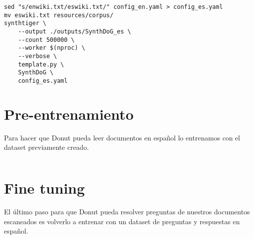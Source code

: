 \documentclass[../main.tex]{subfiles}
\begin{document}
\begin{verbatim}
sed "s/enwiki.txt/eswiki.txt/" config_en.yaml > config_es.yaml
mv eswiki.txt resources/corpus/
synthtiger \
	--output ./outputs/SynthDoG_es \
	--count 500000 \
	--worker $(nproc) \
	--verbose \
	template.py \
	SynthDoG \
	config_es.yaml
\end{verbatim}

\section{Pre-entrenamiento}

Para hacer que Donut pueda leer documentos en español lo entrenamos con el dataset previamente
creado.

\inputminted[bgcolor=codeBack, tabsize=2]{bash}{train.sh}

\section{Fine tuning}

El último paso para que Donut pueda resolver preguntas de nuestros documentos escaneados es volverlo a entrenar con un dataset de preguntas y respuestas en español.
\end{document}

